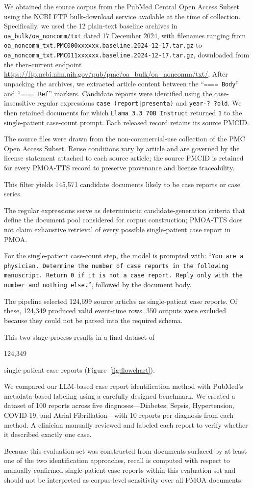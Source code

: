 \documentclass[pdflatex,sn-mathphys-num]{sn-jnl}%
\newif\ifshowrebuttalcolor
\newcommand{\rebuttal}[1]{%
  \ifshowrebuttalcolor
    \textcolor{rebuttalblue}{#1}%
  \else
    #1%
  \fi
}
\theoremstyle{thmstyleone}%
\theoremstyle{thmstyletwo}%
\theoremstyle{thmstylethree}%
\begin{document}
\rebuttal{
We obtained the source corpus from the PubMed Central Open Access Subset using the NCBI FTP bulk-download service available at the time of collection. Specifically, we used the 12 plain-text baseline archives in \texttt{oa\_bulk/oa\_noncomm/txt} dated 17 December 2024, with filenames ranging from \texttt{oa\_noncomm\_txt.PMC000xxxxxx.baseline.2024-12-17.tar.gz} to \texttt{oa\_noncomm\_txt.PMC011xxxxxx.baseline.2024-12-17.tar.gz}, downloaded from the then-current endpoint \url{https://ftp.ncbi.nlm.nih.gov/pub/pmc/oa_bulk/oa_noncomm/txt/}. After unpacking the archives, we extracted article content between the ``\texttt{==== Body}'' and ``\texttt{==== Ref}'' markers. Candidate reports were identified using the case-insensitive regular expressions \texttt{case (report|presenta)} and \texttt{year-? ?old}. We then retained documents for which \texttt{Llama 3.3 70B Instruct} returned \texttt{1} to the single-patient case-count prompt. Each released record retains its source PMCID.
}

\rebuttal{
The source files were drawn from the non-commercial-use collection of the PMC Open Access Subset. Reuse conditions vary by article and are governed by the license statement attached to each source article; the source PMCID is retained for every PMOA-TTS record to preserve provenance and license traceability.
}

This filter yields 145,571 candidate documents likely to be case reports or case series. 
\rebuttal{
The regular expressions serve as deterministic candidate-generation criteria that define the document pool considered for corpus construction; PMOA-TTS does not claim exhaustive retrieval of every possible single-patient case report in PMOA.
}
For the single-patient case-count step, the model is prompted with: ``\texttt{You are a physician. Determine the number of case reports in the following manuscript. Return 0 if it is not a case report. Reply only with the number and nothing else.}'', followed by the document body.
\rebuttal{
The pipeline selected 124{,}699 source articles as single-patient case reports. Of these, 124{,}349 produced valid event-time rows. 350 outputs were excluded because they could not be parsed into the required schema.
}
This two-stage process results in a final dataset of \rebuttal{124{,}349} single-patient case reports (Figure~\ref{fig:flowchart}).

We compared our LLM-based case report identification method with PubMed's metadata-based labeling using a carefully designed benchmark. We created a dataset of 100 reports across five diagnoses—Diabetes, Sepsis, Hypertension, COVID-19, and Atrial Fibrillation—with 10 reports per diagnosis from each method. A clinician manually reviewed and labeled each report to verify whether it described exactly one case.
\rebuttal{
Because this evaluation set was constructed from documents surfaced by at least one of the two identification approaches, recall is computed with respect to manually confirmed single-patient case reports within this evaluation set and should not be interpreted as corpus-level sensitivity over all PMOA documents.
}
\end{document}
